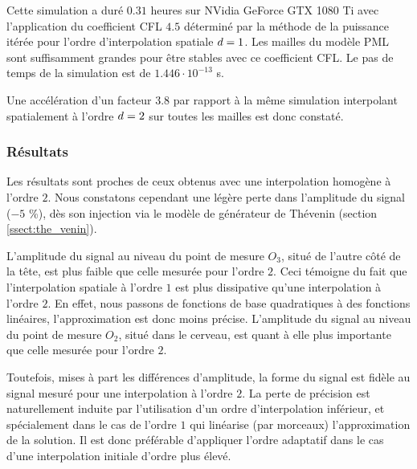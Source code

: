 Cette simulation a duré $0.31$ heures sur NVidia GeForce GTX 1080 Ti
avec l'application du coefficient CFL $4.5$ déterminé par la méthode de la puissance
itérée pour l'ordre d'interpolation spatiale $d=1$.
Les mailles du modèle PML sont suffisamment grandes pour être stables
avec ce coefficient CFL.
Le pas de temps de la simulation est de $1.446 \cdot 10^{-13}$ s.

Une accélération d'un facteur $3.8$
par rapport à la même simulation interpolant spatialement à l'ordre
$d=2$ sur toutes les mailles est donc constaté.


\subsubsection{Résultats}

Les résultats sont proches de ceux obtenus avec une interpolation
homogène à l'ordre $2$.
Nous constatons cependant une légère
perte dans l'amplitude du signal ($-5$ \%), dès son injection
via le modèle de générateur de Thévenin (section \ref{ssect:the_venin}).

L'amplitude du signal au niveau du point de mesure $O_3$,
situé de l'autre côté de la tête, est plus faible que celle
mesurée pour l'ordre $2$. Ceci témoigne du fait que l'interpolation
spatiale à l'ordre $1$ est plus dissipative qu'une interpolation à l'ordre $2$.
En effet, nous passons de fonctions de base quadratiques à des fonctions linéaires,
l'approximation est donc moins précise.
L'amplitude du signal au niveau du point de mesure $O_2$,
situé dans le cerveau, est quant à elle plus importante 
que celle mesurée pour l'ordre $2$.

Toutefois, mises à part les différences d'amplitude, la forme du signal est fidèle
au signal mesuré pour une interpolation à l'ordre $2$.
La perte de précision est naturellement induite par l'utilisation d'un ordre
d'interpolation inférieur, et spécialement dans le cas de l'ordre $1$
qui linéarise (par morceaux) l'approximation de la solution.
Il est donc préférable d'appliquer l'ordre adaptatif dans le cas
d'une interpolation initiale d'ordre plus élevé.
\\

